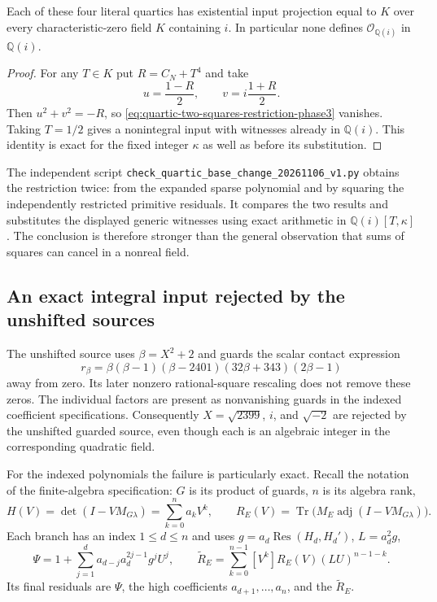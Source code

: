 \begin{proposition}\label{prop:quartic-collapse-Qi-phase3}
Each of these four literal quartics has existential input
projection equal to $K$ over every characteristic-zero field
$K$ containing $i$.  In particular none defines
$\mathcal O_{\mathbb Q(i)}$ in $\mathbb Q(i)$.
\end{proposition}
\begin{proof}
For any $T\in K$ put $R=C_N+T^4$ and take
\[
                         u=\frac{1-R}{2},\qquad
                         v=i\frac{1+R}{2}.
\]
Then $u^2+v^2=-R$, so
\eqref{eq:quartic-two-squares-restriction-phase3} vanishes.
Taking $T=1/2$ gives a nonintegral input with witnesses already
in $\mathbb Q(i)$.  This identity is exact for the fixed integer
$\kappa$ as well as before its substitution.
\end{proof}

The independent script
\texttt{check\_quartic\_base\_change\_20261106\_v1.py}
obtains the restriction twice: from the expanded sparse polynomial
and by squaring the independently restricted primitive residuals.
It compares the two results and substitutes the displayed generic
witnesses using exact arithmetic in
$\mathbb Q(i)[T,\kappa]$.  The conclusion is therefore stronger
than the general observation that sums of squares can cancel in a
nonreal field.

\subsection{An exact integral input rejected by the unshifted sources}

The unshifted source uses $\beta=X^2+2$ and guards the scalar
contact expression
\begin{equation}\label{eq:scalar-contact-polynomial-phase3}
       r_\beta=\beta(\beta-1)(\beta-2401)
                         (32\beta+343)(2\beta-1)
\end{equation}
away from zero.  Its later nonzero rational-square rescaling does
not remove these zeros.  The individual factors are present as
nonvanishing guards in the indexed coefficient specifications.
Consequently $X=\sqrt{2399}$, $i$, and $\sqrt{-2}$ are rejected
by the unshifted guarded source, even though each is an algebraic
integer in the corresponding quadratic field.

For the indexed polynomials the failure is particularly exact.
Recall the notation of the finite-algebra specification:
$G$ is its product of guards, $n$ is its algebra rank,
\[
 H(V)=\det(I-VM_{G\lambda})=\sum_{k=0}^n a_kV^k,
 \qquad
 R_E(V)=\operatorname{Tr}\bigl(M_E\operatorname{adj}
                       (I-VM_{G\lambda})\bigr).
\]
Each branch has an index $1\le d\le n$ and uses
$g=a_d\operatorname{Res}(H_d,H_d')$, $L=a_d^2g$,
\[
 \Psi=1+\sum_{j=1}^d a_{d-j}a_d^{2j-1}g^jU^j,
 \qquad
 \widetilde R_E=\sum_{k=0}^{n-1}[V^k]R_E(V)(LU)^{n-1-k}.
\]
Its final residuals are $\Psi$, the high coefficients
$a_{d+1},\ldots,a_n$, and the $\widetilde R_E$.

